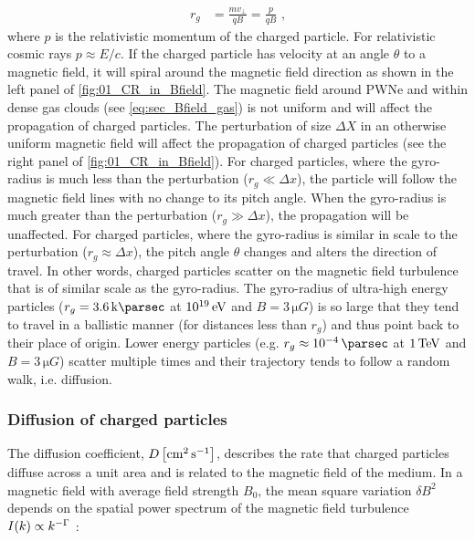 \begin{equation}
    \begin{aligned}
    r_g&=\frac{mv_\perp}{qB}=\frac{p}{qB}\text{ ,}
    \end{aligned} \label{eq:chapter_1_gyro-radius}
\end{equation}
\noindent where $p$ is the relativistic momentum of the charged particle. For relativistic cosmic rays $p\approx E/c$. If the charged particle has velocity at an angle $\theta$ to a magnetic field, it will spiral around the magnetic field direction as shown in the left panel of \autoref{fig:01_CR_in_Bfield}.
\newpar 
The magnetic field around PWNe and within dense gas clouds (see \autoref{eq:sec_Bfield_gas}) is not uniform and will affect the propagation of charged particles. The perturbation of size $\Delta X$ in an otherwise uniform magnetic field will affect the propagation of charged particles (see the right panel of \autoref{fig:01_CR_in_Bfield}). For charged particles, where the gyro-radius is much less than the perturbation ($r_g\ll \Delta x$), the particle will follow the magnetic field lines with no change to its pitch angle. When the gyro-radius is much greater than the perturbation ($r_g\gg \Delta x$), the propagation will be unaffected. For charged particles, where the gyro-radius is similar in scale to the perturbation ($r_g\approx \Delta x$), the pitch angle $\theta$ changes and alters the direction of travel. In other words, charged particles scatter on the magnetic field turbulence that is of similar scale as the gyro-radius.
\newpar
The gyro-radius of ultra-high energy particles ($r_g=3.6\,\kpc$ at $10^{19}\,\si{\electronvolt}$ and $B=3\,\si{\micro G}$) is so large that they tend to travel in a ballistic manner (for distances less than $r_g$) and thus point back to their place of origin. Lower energy particles (e.g. $r_g\approx 10^{-4}\,\pc$ at $1\,\TeV$ and $B=3\,\si{\micro G}$) scatter multiple times and their trajectory tends to follow a random walk, i.e. diffusion.

\subsubsection{Diffusion of charged particles} 

The diffusion coefficient, $D\,\qty[\si{\centi\meter\squared\per\second}]$, describes the rate that charged particles diffuse across a unit area and is related to the magnetic field of the medium. In a magnetic field with average field strength $B_0$, the mean square variation $\delta B^2$ depends on the spatial power spectrum of the magnetic field turbulence $I\qty(k)\propto k^{-\Gamma}$ \citep{1983RPPh...46..973D,2016MNRAS.461.3552N}:

